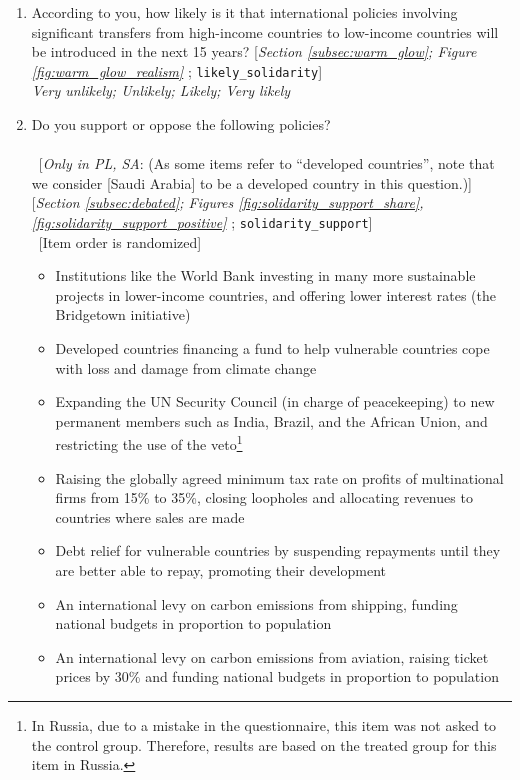 \begin{enumerate}[resume]
\item  \label{q:likely_solidarity} According to you, how likely is it that international policies involving significant transfers from high-income countries to low-income countries will be introduced in the next 15 years? [\textit{Section \ref{subsec:warm_glow}; Figure \ref{fig:warm_glow_realism}%
}; 
\verb|likely_solidarity|]
  \\ \textit{Very unlikely; Unlikely; Likely; Very likely}

\item  \label{q:solidarity_support} Do you support or oppose the following policies?\\
~\\ 
~[\textit{Only in PL, SA}: (As some items refer to ``developed countries'', note that we consider [Saudi Arabia] to be a developed country in this question.)] [\textit{Section \ref{subsec:debated}; Figures \ref{fig:solidarity_support_share}, \ref{fig:solidarity_support_positive}%
}; 
\verb|solidarity_support|] \\
~[Item order is randomized]
\begin{itemize}
    \item Institutions like the World Bank investing in many more sustainable projects in lower-income countries, and offering lower interest rates (the Bridgetown initiative)
    \item Developed countries financing a fund to help vulnerable countries cope with loss and damage from climate change
    \item Expanding the UN Security Council (in charge of peacekeeping) to new permanent members such as India, Brazil, and the African Union, and restricting the use of the veto\footnote{In Russia, due to a mistake in the questionnaire, this item was not asked to the control group. Therefore, results are based on the treated group for this item in Russia. }
    \item Raising the globally agreed minimum tax rate on profits of multinational firms from 15\% to 35\%, closing loopholes and allocating revenues to countries where sales are made
    \item Debt relief for vulnerable countries by suspending repayments until they are better able to repay, promoting their development
    \item An international levy on carbon emissions from shipping, funding national budgets in proportion to population
    \item An international levy on carbon emissions from aviation, raising ticket prices by 30\% and funding national budgets in proportion to population

\end{itemize}
\end{enumerate}
